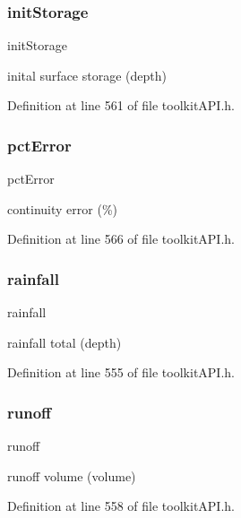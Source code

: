 \subsubsection{\texorpdfstring{initStorage}{initStorage}}
{\footnotesize\ttfamily init\+Storage}

inital surface storage (depth) 

Definition at line 561 of file toolkit\+A\+P\+I.\+h.

\mbox{\label{struct_s_m___runoff_totals_a061bfec118db4216f0062258ce029ec2}} 
\subsubsection{\texorpdfstring{pctError}{pctError}}
{\footnotesize\ttfamily pct\+Error}

continuity error (\%) 

Definition at line 566 of file toolkit\+A\+P\+I.\+h.

\mbox{\label{struct_s_m___runoff_totals_a9e7224629321a940c1f8f9a64e73a588}} 
\subsubsection{\texorpdfstring{rainfall}{rainfall}}
{\footnotesize\ttfamily rainfall}

rainfall total (depth) 

Definition at line 555 of file toolkit\+A\+P\+I.\+h.

\mbox{\label{struct_s_m___runoff_totals_a4dcd362194c38698fe8f5b2659ba2dc6}} 
\subsubsection{\texorpdfstring{runoff}{runoff}}
{\footnotesize\ttfamily runoff}

runoff volume (volume) 

Definition at line 558 of file toolkit\+A\+P\+I.\+h.

